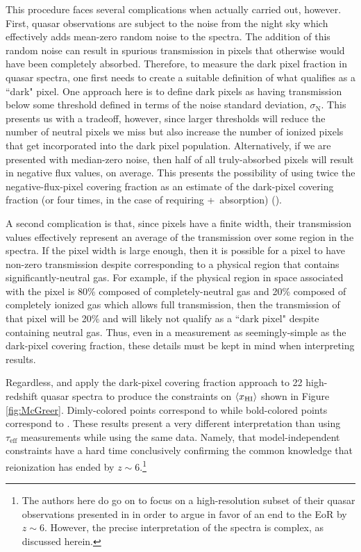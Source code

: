 This procedure faces several complications when actually carried out, however. First, quasar observations are subject to the noise from the night sky which effectively adds mean-zero random noise to the spectra. The addition of this random noise can result in spurious transmission in pixels that otherwise would have been completely absorbed. Therefore, to measure the dark pixel fraction in quasar spectra, one first needs to create a suitable definition of what qualifies as a ``dark" pixel. One approach here is to define dark pixels as having transmission below some threshold defined in terms of the noise standard deviation, $\sigma_{\text{N}}$. This presents us with a tradeoff, however, since larger thresholds will reduce the number of neutral pixels we miss but also increase the number of ionized pixels that get incorporated into the dark pixel population. Alternatively, if we are presented with median-zero noise, then half of all truly-absorbed pixels will result in negative flux values, on average. This presents the possibility of using twice the negative-flux-pixel covering fraction as an estimate of the dark-pixel covering fraction (or four times, in the case of requiring \lya +\lyb\ absorption) (\citealt{McGreer:2014qwa}). 

A second complication is that, since pixels have a finite width, their transmission values effectively represent an average of the transmission over some region in the spectra. If the pixel width is large enough, then it is possible for a pixel to have non-zero transmission despite corresponding to a physical region that contains significantly-neutral gas. For example, if the physical region in space associated with the pixel is 80\% composed of completely-neutral gas and 20\% composed of completely ionized gas which allows full transmission, then the transmission of that pixel will be 20\% and will likely not qualify as a ``dark pixel" despite containing neutral gas. Thus, even in a measurement as seemingly-simple as the dark-pixel covering fraction, these details must be kept in mind when interpreting results. 

Regardless, \citet{McGreer:2011dm} and \citet{McGreer:2014qwa} apply the dark-pixel covering fraction approach to 22 high-redshift quasar spectra to produce the constraints on $\langle x_{\text{HI}}\rangle$ shown in Figure \ref{fig:McGreer}. Dimly-colored points correspond to \citet{McGreer:2011dm} while bold-colored points correspond to \citet{McGreer:2014qwa}. These results present a very different interpretation than using $\tau_{\text{eff}}$ measurements while using the same data. Namely, that model-independent constraints have a hard time conclusively confirming the common knowledge that reionization has ended by $z \sim 6$.\footnote{The authors here do go on to focus on a high-resolution subset of their quasar observations presented in \citet{McGreer:2014qwa} in order to argue in favor of an end to the EoR by $z \sim 6$. However, the precise interpretation of the spectra is complex, as discussed herein.} 

